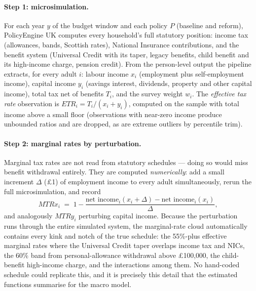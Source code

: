 \paragraph{Step 1: microsimulation.} For each year $y$ of the budget window and each policy $P$ (baseline and reform), PolicyEngine UK \citep{PolicyEngineUK} computes every household's full statutory position: income tax (allowances, bands, Scottish rates), National Insurance contributions, and the benefit system (Universal Credit with its taper, legacy benefits, child benefit and its high-income charge, pension credit). From the person-level output the pipeline extracts, for every adult $i$: labour income $x_i$ (employment plus self-employment income), capital income $y_i$ (savings interest, dividends, property and other capital income), total tax net of benefits $T_i$, and the survey weight $w_i$. The \emph{effective tax rate} observation is $ETR_i = T_i/(x_i + y_i)$, computed on the sample with total income above a small floor (observations with near-zero income produce unbounded ratios and are dropped, as are extreme outliers by percentile trim).

\paragraph{Step 2: marginal rates by perturbation.} Marginal tax rates are not read from statutory schedules --- doing so would miss benefit withdrawal entirely. They are computed \emph{numerically}: add a small increment $\Delta$ (\pounds 1) of employment income to every adult simultaneously, rerun the full microsimulation, and record
\begin{equation}
\label{eq:mtrpert}
MTRx_i \;=\; 1 - \frac{\text{net income}_i(x_i+\Delta) - \text{net income}_i(x_i)}{\Delta},
\end{equation}
and analogously $MTRy_i$ perturbing capital income. Because the perturbation runs through the entire simulated system, the marginal-rate cloud automatically contains every kink and notch of the true schedule: the 55\%-plus effective marginal rates where the Universal Credit taper overlaps income tax and NICs, the 60\% band from personal-allowance withdrawal above \pounds 100,000, the child-benefit high-income charge, and the interactions among them. No hand-coded schedule could replicate this, and it is precisely this detail that the estimated functions summarise for the macro model.


